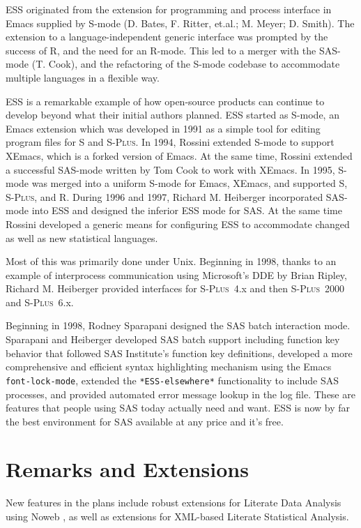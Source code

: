 \documentclass{article}
\newcommand*{\Splus}{\textsc{S-Plus}}
\newcommand{\stexttt}[1]{{\small\texttt{#1}}}
\begin{document}
ESS originated from the extension for programming and process
interface in Emacs supplied by S-mode (D. Bates, F. Ritter, et.al.; 
M. Meyer; D. Smith).  The extension to a language-independent generic
interface was prompted by the success of R, and the need for an
R-mode.  This led to a merger with the SAS-mode (T. Cook), and the
refactoring of the S-mode codebase to accommodate multiple languages
in a flexible way.

ESS is a remarkable example of how open-source products can continue
to develop beyond what their initial authors planned.  ESS started as
S-mode, an Emacs extension which was developed in 1991 as a simple
tool for editing program files for S and \Splus.  In 1994, Rossini
extended S-mode to support XEmacs, which is a forked version of
Emacs.  At the same time, Rossini extended a successful SAS-mode
written by Tom Cook to work with XEmacs.  In 1995, S-mode was merged
into a uniform S-mode for Emacs, XEmacs, and supported S, \Splus, and
R.  During 1996 and 1997, Richard M. Heiberger incorporated 
SAS-mode into ESS and designed the inferior ESS mode for SAS.
At the same time Rossini developed a
generic means for configuring ESS to accommodate changed as well as
new statistical languages.

Most of this was primarily done under Unix.  Beginning in 1998, thanks
to an example of interprocess communication using Microsoft's DDE by
Brian Ripley, Richard M. Heiberger provided interfaces for \Splus~4.x
and then \Splus~2000 and \Splus~6.x.  

Beginning in 1998, Rodney Sparapani designed the SAS batch interaction
mode.  Sparapani and Heiberger developed SAS batch support including
function key behavior that followed SAS Institute's function key
definitions,  developed a more comprehensive and efficient syntax
highlighting mechanism using the Emacs \stexttt{font-lock-mode},
extended the  \stexttt{*ESS-elsewhere*} functionality to include SAS processes,
and provided  automated error message lookup in the log file.
These are features that people using SAS today
actually need and want.  ESS is now by far the best environment for
SAS available at any price and it's free.

\section{Remarks and Extensions}
\label{sec:remarks}

New
features in the plans include robust extensions for Literate Data
Analysis using Noweb \citep{NRamsey:1994}, as well as extensions for
XML-based Literate Statistical Analysis.
\end{document}
